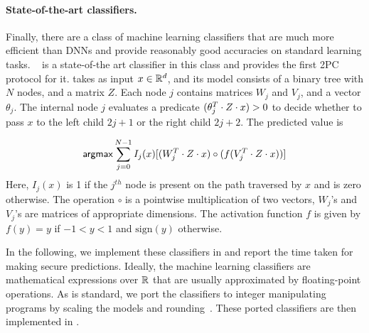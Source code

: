 \paragraph{State-of-the-art classifiers.}
Finally, there are a class of machine learning classifiers that are
much more efficient than
DNNs and provide reasonably good accuracies on standard learning
tasks. \bonsai~\cite{bonsai} is a state-of-the art classifier in this
class and \tool provides the first 2PC protocol for it.
\bonsai takes as input $x \in {\mathbb{R}}^d$, and its model consists of a
binary tree with $N$ nodes, and a matrix $Z$. Each node $j$ contains
matrices $W_j$ and $V_j$, and a vector $\theta_{j}$. The internal node
$j$  evaluates a predicate $(\theta_j^T \cdot Z \cdot x) > 0$ to decide whether
to pass $x$ to the left child $2j+1$ or the right child $2j+2$.
The predicted value is

\[
{\sf argmax} \sum_{j = 0}^{N - 1} I_j(x)[ (W_j^T\cdot Z\cdot x) \circ (f(V_j^T\cdot Z\cdot x))] 
\]
Here, $I_j(x)$ is 1 if the $j^{th}$ node is present on the path traversed by $x$
and is zero otherwise. 
The operation $\circ$ is a pointwise multiplication of two vectors, $W_j$'s and $V_j$'s
are matrices of appropriate dimensions. The activation function $f$ is given by $f(y) = y$ if
$-1 < y < 1$ and $\mathrm{sign}(y)$ otherwise.

In the following, we implement these classifiers in \tool and report
the time taken for making secure predictions. Ideally, the machine
learning classifiers are mathematical expressions over ${\mathbb{R}}$ that are
usually approximated by floating-point operations. 
As is standard, we port the classifiers to integer manipulating
programs by scaling the models and rounding~\cite{minionn}. These
ported classifiers are then implemented in \tool.